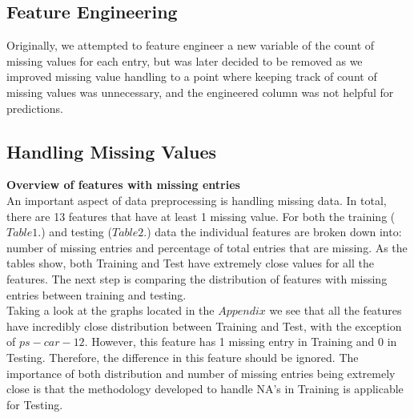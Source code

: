 \documentclass[fleqn,10pt]{SelfArx} %
\begin{document}
\subsection{Feature Engineering}
Originally, we attempted to feature engineer a new variable of the count of missing values for each entry, but was later decided to be removed as we improved missing value handling to a point where keeping track of count of missing values was unnecessary, and the engineered column was not helpful for predictions.
\subsection{Handling Missing Values}
\textbf{Overview of features with missing entries}\\
An important aspect of data preprocessing is handling missing data. In total, there are 13 features that have at least 1 missing value. For both the training ($Table 1.$) and testing ($Table 2.$) data the individual features are broken down into: number of missing entries and percentage of total entries that are missing. As the tables show, both Training and Test have extremely close values for all the features. The next step is comparing the distribution of features with missing entries between training and testing.\\  
Taking a look at the graphs located in the $Appendix$ we see that all the features have incredibly close distribution between Training and Test, with the exception of $ps-car-12$. However, this feature has 1 missing entry in Training and 0 in Testing. Therefore, the difference in this feature should be ignored. The importance of both distribution and number of missing entries being extremely close is that the methodology developed to handle NA's in Training is applicable for Testing. \\
\\
\end{document}
